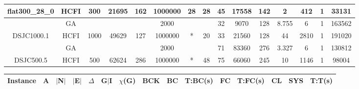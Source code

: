 \documentclass[10pt]{article}
\begin{document}
\begin{center}
\begin{table}[H]
\begin{tabular}{|c|c|c|c|c|c|c|c|c|c|c|c|c|c|c|}
 \multirow{-2}{*}{flat300\_28\_0} &HCFI   &\multirow{-2}{*}{300}   &\multirow{-2}{*}{21695}     &\multirow{-2}{*}{162}     &1000000     &\multirow{-2}{*}{\cellcolor{yellow}28}      & \multirow{-2}{*}{\cellcolor{yellow}28}    &{\cellcolor{green}45}     &17558         &142    &2         &412    &1     &33131        \\ \hline \hline
	&GA&       &                   &                     &   2000      &     \cellcolor{yellow} & {\cellcolor{yellow}}& {{\cellcolor{green}32}}
&9070   &128        &8.755                   &6                    &1          &163562        \\ \cline{2-2} \cline{6-6} \cline{9-15}
 \multirow{-2}{*}{DSJC1000.1} &HCFI   &\multirow{-2}{*}{1000}   &\multirow{-2}{*}{49629}     &\multirow{-2}{*}{127}     & 1000000    &\multirow{-2}{*}{\cellcolor{yellow}*}      & \multirow{-2}{*}{\cellcolor{yellow}20}    &{\cellcolor{green}33}     &21560         &128    &44         &2810   & 1    & 191020       \\ \hline \hline
	&GA&       &                   &                     &   2000      &     \cellcolor{yellow} & {\cellcolor{yellow}}& {{\cellcolor{green}71}}
& 83360  &276        & 3.327                  &6                    &1         &130812        \\ \cline{2-2} \cline{6-6} \cline{9-15}
 \multirow{-2}{*}{DSJC500.5} &HCFI   &\multirow{-2}{*}{500}   &\multirow{-2}{*}{62624}     &\multirow{-2}{*}{286}     &1000000     &\multirow{-2}{*}{\cellcolor{yellow}*}      & \multirow{-2}{*}{\cellcolor{yellow}48}    &{\cellcolor{green}75}     &66060         &245    &10         &1146    &1     &98004        \\ \hline 

\end{tabular}
\end{table}
\begin{table}[H]
\begin{tabular}{|c|c|c|c|c|c|c|c|c|c|c|c|c|c|c|}
\hline
Instance& A &$|$N$|$ & $|$E$|$ & $\Delta$ & G$|$I & $\chi$(G) &BCK&BC & T:BC(s) & FC & T:FC(s) & CL & SYS & T:T(s) \\ \hline \hline


\end{tabular}
\end{table}
\end{center}
\end{document}
